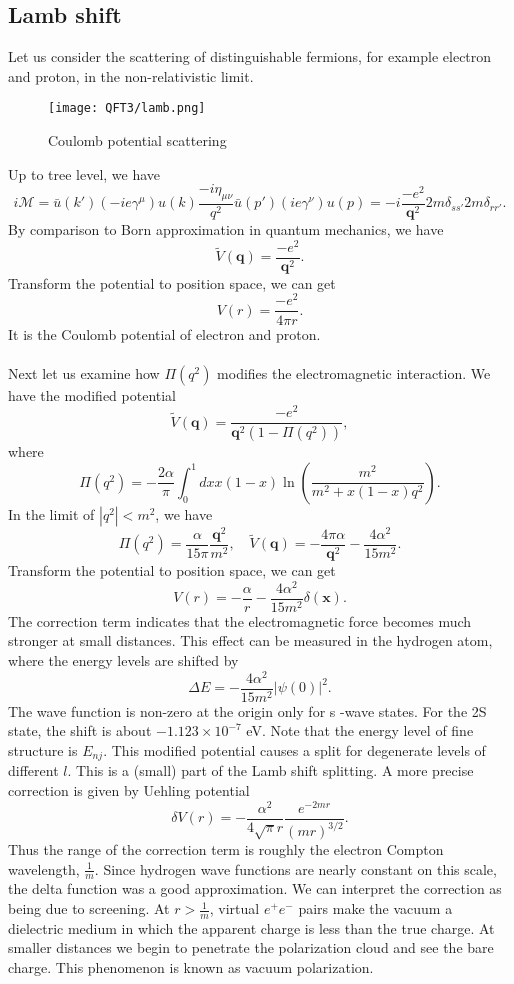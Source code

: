 \subsection{Lamb shift}
Let us consider the scattering of distinguishable fermions, for example electron and proton, in the non-relativistic limit. 

\begin{figure}[!h]
\centering
\texttt{[image: QFT3/lamb.png]}
\caption{Coulomb potential scattering} 
\end{figure}

\noindent
Up to tree level, we have
\[i\mathcal{M} = \bar{u}(k')(-ie\gamma^{\mu})u(k) \frac{-i\eta_{\mu\nu}}{q^2} \bar{u}(p')(ie\gamma^{\nu})u(p) = -i \frac{-e^2}{\bm{q}^2} 2m \delta_{ss'} 2m\delta_{rr'}.\]
By comparison to Born approximation in quantum mechanics, we have
\[\tilde{V}(\bm{q}) = \frac{-e^2}{\bm{q}^2}.\]
Transform the potential to position space, we can get
\[V(r) = \frac{-e^2}{4\pi r}.\]
It is the Coulomb potential of electron and proton.
\\ \\
Next let us examine how $\Pi(q^2)$ modifies the electromagnetic interaction. We have the modified potential
\[\tilde{V}(\bm{q}) = \frac{-e^2}{\bm{q}^2(1-\Pi(q^2))},\]
where
\[\Pi(q^2) = -\frac{2\alpha}{\pi} \int_0^1 dx x(1-x) \ln \left( \frac{m^2}{m^2 + x(1-x)q^2} \right).\]
In the limit of $|q^2|<m^2$, we have
\[\Pi(q^2) = \frac{\alpha}{15\pi}\frac{\bm{q}^2}{m^2} , \quad \tilde{V}(\bm{q}) = -\frac{4\pi\alpha}{\bm{q}^2} - \frac{4\alpha^2}{15m^2}.\]
Transform the potential to position space, we can get
\[V(r) = -\frac{\alpha}{r} - \frac{4\alpha^2}{15m^2} \delta(\bm{x}).\]
The correction term indicates that the electromagnetic force becomes much stronger at small distances. This effect can be measured in the hydrogen atom, where the energy levels are shifted by
\[\Delta E = - \frac{4\alpha^2}{15m^2} |\psi(0)|^2.\]
The wave function is non-zero at the origin only for s -wave states. For the 2S state, the shift is about $-1.123 \times 10^{-7}$ eV. Note that the energy level of fine structure is $E_{nj}$. This modified potential causes a split for degenerate levels of different $l$. This is a (small) part of the Lamb shift splitting.
A more precise correction is given by Uehling potential
\[\delta V(r) = -\frac{\alpha^2}{4\sqrt{\pi}r} \frac{e^{-2mr}}{(mr)^{3/2}}.\]
Thus the range of the correction term is roughly the electron Compton wavelength, $\frac{1}{m}$. 
Since hydrogen wave functions are nearly constant on this scale, the delta function was a good approximation.
We can interpret the correction as being due to screening. At $r > \frac{1}{m}$, virtual $e^+e^-$ pairs make the vacuum a dielectric medium in which the apparent charge is less than the true charge. 
At smaller distances we begin to penetrate the polarization cloud and see the bare charge. This phenomenon is known as vacuum polarization.
